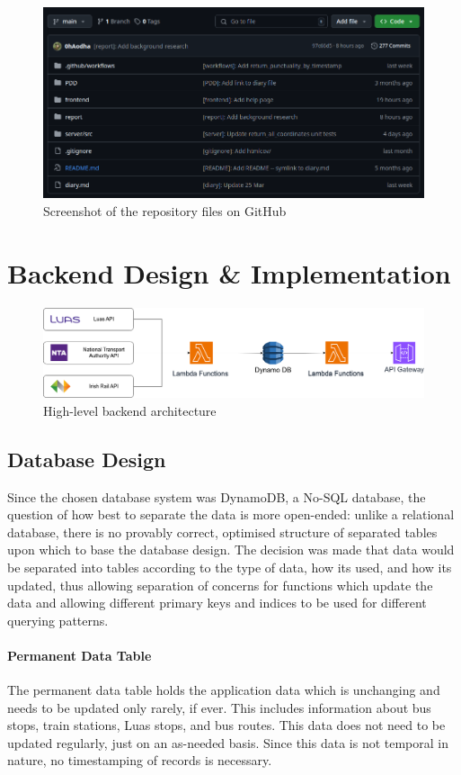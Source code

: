 \documentclass[a4paper,11pt]{report}
\begin{document}
\begin{figure}[H]
    \centering
    \includegraphics[width=\textwidth]{./images/reposs.png}
    \caption{Screenshot of the repository files on GitHub}
    \label{fig:reposs}
\end{figure}

\chapter{Backend Design \& Implementation}
\begin{figure}[H]
    \centering
    \includegraphics[width=\textwidth]{./images/overall_backend.png}
    \caption{High-level backend architecture}
\end{figure}

\section{Database Design}
Since the chosen database system was DynamoDB, a No-SQL database, the question of how best to separate the data is more open-ended: unlike a relational database, there is no provably correct, optimised structure of separated tables upon which to base the database design.
The decision was made that data would be separated into tables according to the type of data, how its used, and how its updated, thus allowing separation of concerns for functions which update the data and allowing different primary keys and indices to be used for different querying patterns.

\subsubsection{Permanent Data Table}
The permanent data table holds the application data which is unchanging and needs to be updated only rarely, if ever.
This includes information about bus stops, train stations, Luas stops, and bus routes.
This data does not need to be updated regularly, just on an as-needed basis.
Since this data is not temporal in nature, no timestamping of records is necessary.
\end{document}
